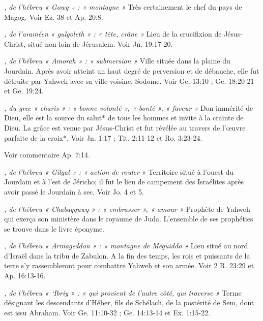 \begin{multicols}{2}
{\textit{, de l'hébreu « Gowg » : « montagne »}\newline
Très certainement le chef du pays de Magog. Voir Ez. 38 et Ap. 20:8.

\textit{, de l'araméen « gulgoleth » : « tête, crâne »}\newline
Lieu de la crucifixion de Jésus-Christ, situé non loin de Jérusalem. Voir Jn. 19:17-20.

\textit{, de l'hébreu « Amorah » : « submersion »}\newline
Ville située dans la plaine du Jourdain. Après avoir atteint un haut degré de perversion et de débauche, elle fut détruite par Yahweh avec sa ville voisine, Sodome. Voir Ge. 13:10 ; Ge. 18:20-21 et Ge. 19:24.

\textit{, du grec « charis » : « bonne volonté », « bonté », « faveur »}\newline
Don immérité de Dieu, elle est la source du salut* de tous les hommes et invite à la crainte de Dieu. La grâce est venue par Jésus-Christ et fut révélée au travers de l'œuvre parfaite de la croix*. Voir Jn. 1:17 ; Tit. 2:11-12 et Ro. 3:23-24.

\textit{}\newline
Voir commentaire Ap. 7:14.

\textit{, de l'hébreu « Gilgal » : « action de rouler »}\newline
Territoire situé à l'ouest du Jourdain et à l'est de Jéricho; il fut le lieu de campement des Israélites après avoir passé le Jourdain à sec. Voir Jo. 4 et 5.

\textit{, de l'hébreu « Chabaqquwq » : « embrasser », « amour »}\newline
Prophète de Yahweh qui exerça son ministère dans le royaume de Juda. L'ensemble de ses prophéties se trouve dans le livre éponyme.

\textit{, de l'hébreu « Armageddon » : « montagne de Méguiddo »}\newline
Lieu situé au nord d'Israël dans la tribu de Zabulon. A la fin des temps, les rois et puissants de la terre s'y rassembleront pour combattre Yahweh et son armée. Voir 2 R. 23:29 et Ap. 16:13-16.

\textit{, de l'hébreu « `Ibriy » : « qui provient de l'autre côté, qui traverse »}\newline
Terme désignant les descendants d'Héber, fils de Schélach, de la postérité de Sem, dont est issu Abraham. Voir Ge. 11:10-32 ; Ge. 14:13-14 et Ex. 1:15-22.

}
\end{multicols}
